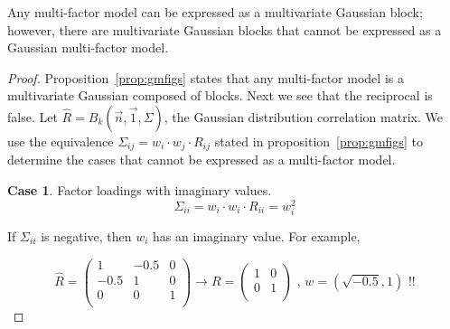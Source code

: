 \documentclass[11pt,fleqn]{book} %
\begin{document}
\begin{proposition}
	\label{prop:ibne}
	Any multi-factor model can be expressed as a multivariate Gaussian 
	block; however, there are multivariate Gaussian blocks that cannot be 
	expressed as a Gaussian multi-factor model.
\end{proposition}
\begin{proof}
	Proposition~\ref{prop:gmfigs} states that any multi-factor model 
	is a multivariate Gaussian composed of blocks.
	Next we see that the reciprocal is false. Let 
	$\widehat{R} = B_k(\vec{n},\vec{1},\Sigma)$, the Gaussian distribution 
	correlation matrix. We use the equivalence 
	$\Sigma_{ij} = w_i \cdot w_j \cdot R_{ij}$ stated in 
	proposition~\ref{prop:gmfigs} to determine the cases that cannot be 
	expressed as a multi-factor model.

	\textbf{Case 1}. Factor loadings with imaginary values.
	\begin{displaymath}
		\Sigma_{ii} = w_i \cdot w_i \cdot R_{ii} = w_i^2
	\end{displaymath}
	\begin{adjustwidth}{1cm}{0pt}
		If $\Sigma_{ii}$ is negative, then $w_i$ has an imaginary value.
		For example,
	\end{adjustwidth}
	\begin{displaymath}
		\widehat{R} = \left(
		\begin{array}{cc|c}
			1    & -0.5 & 0 \\
			-0.5 & 1    & 0 \\
			\hline
			0    & 0    & 1 \\
		\end{array}
		\right) 
		\longrightarrow
		R = \left(
		\begin{array}{cc}
			1 & 0 \\
			0 & 1 \\
		\end{array}
		\right)
		\text{ , }
		w = (\sqrt{-0.5}, 1)
		\text{ !!}
	\end{displaymath}
	

\end{proof}
\end{document}
